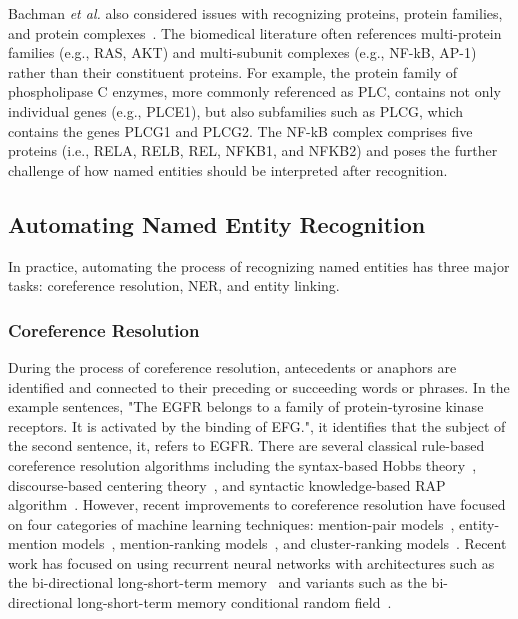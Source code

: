 Bachman \textit{et al.} also considered issues with recognizing proteins, protein families, and protein complexes~\cite{Bachman2018}.
The biomedical literature often references multi-protein families (e.g., RAS, AKT) and multi-subunit complexes (e.g., NF-kB, AP-1) rather than their constituent proteins.
For example, the protein family of phospholipase C enzymes, more commonly referenced as PLC, contains not only individual genes (e.g., PLCE1), but also subfamilies such as PLCG, which contains the genes PLCG1 and PLCG2.
The NF-kB complex comprises five proteins (i.e., RELA, RELB, REL, NFKB1, and NFKB2) and poses the further challenge of how named entities should be interpreted after recognition.

\subsection{Automating Named Entity Recognition}

In practice, automating the process of recognizing named entities has three major tasks: coreference resolution, \ac{NER}, and entity linking.

\subsubsection*{Coreference Resolution}

During the process of coreference resolution, antecedents or anaphors are identified and connected to their preceding or succeeding words or phrases.
In the example sentences, "The EGFR belongs to a family of protein-tyrosine kinase receptors.
It is activated by the binding of EFG.", it identifies that the subject of the second sentence, it, refers to EGFR.
There are several classical rule-based coreference resolution algorithms including the syntax-based Hobbs theory~\cite{Hobbs1978}, discourse-based centering theory~\cite{Brennan1987}, and syntactic knowledge-based RAP algorithm~\cite{Brennan1987}.
However, recent improvements to coreference resolution have focused on four categories of machine learning techniques: mention-pair models~\cite{Soon2001,Ng2002,Bengtson2008}, entity-mention models~\cite{Luo2004,Yang2004,Yang2008}, mention-ranking models~\cite{Lee2011,Denis2007,Rahman2009,martschat2015}, and cluster-ranking models~\cite{Rahman2011,Ma2014,Clark2016}.
Recent work has focused on using recurrent neural networks with architectures such as the bi-directional long-short-term memory~\cite{Li2018} and variants such as the bi-directional long-short-term memory conditional random field~\cite{Giorgi526244}.

